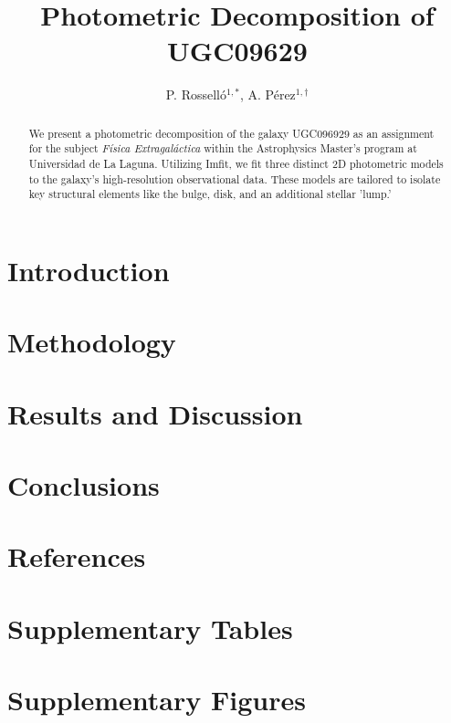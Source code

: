 \documentclass{anotherarticlestyle}
\title{Photometric Decomposition of UGC09629}
\author{P. Rosselló$^{1,*}$, A. Pérez$^{1, \dagger}$}
\begin{document}
\maketitle

\begin{strip}
\begin{abstract}
{\small We present a photometric decomposition of the galaxy UGC096929 as an assignment for the subject \textit{Física Extragaláctica} within the Astrophysics Master’s program at Universidad de La Laguna. Utilizing Imfit, we fit three distinct 2D photometric models to the galaxy's high-resolution observational data. These models are tailored to isolate key structural elements like the bulge, disk, and an additional stellar 'lump.'}
\end{abstract}
\end{strip}

\section{Introduction}



\section{Methodology}


\section{Results and Discussion}


\section{Conclusions}




\newpage
\pagebreak
\section*{References}




\onecolumn
\newpage
\pagebreak
\section*{Supplementary Tables}


\twocolumn
\onecolumn
\newpage
\pagebreak
\section*{Supplementary Figures}

\end{document}
